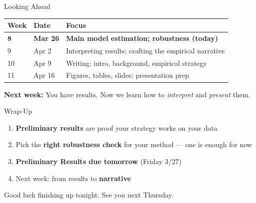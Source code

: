 \begin{frame}{Looking Ahead}
  \small
  \begin{tabular}{@{}llp{6cm}@{}}
    \toprule
    \textbf{Week} & \textbf{Date} & \textbf{Focus} \\
    \midrule
    \textbf{8} & \textbf{Mar 26} & \textbf{Main model estimation; robustness (today)} \\
    9 & Apr 2 & Interpreting results; crafting the empirical narrative \\
    10 & Apr 9 & Writing: intro, background, empirical strategy \\
    11 & Apr 16 & Figures, tables, slides; presentation prep \\
    \bottomrule
  \end{tabular}

  \vspace{8pt}

  \textbf{Next week:} You have results. Now we learn how to \textit{interpret} and \textit{present} them.
\end{frame}

\begin{frame}{Wrap-Up}
  \begin{enumerate}
    \item \textbf{Preliminary results} are proof your strategy works on your data
    \item Pick the \textbf{right robustness check} for your method --- one is enough for now
    \item \textbf{Preliminary Results due tomorrow} (Friday 3/27)
    \item Next week: from results to \textbf{narrative}
  \end{enumerate}

  \vspace{8pt}

  Good luck finishing up tonight. See you next Thursday.
\end{frame}


